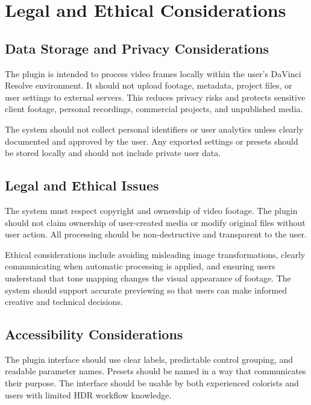 \documentclass[12pt]{article}
\begin{document}

\section{Legal and Ethical Considerations}

\subsection{Data Storage and Privacy Considerations}
The plugin is intended to process video frames locally within the user's DaVinci Resolve environment. It should not upload footage, metadata, project files, or user settings to external servers. This reduces privacy risks and protects sensitive client footage, personal recordings, commercial projects, and unpublished media.

The system should not collect personal identifiers or user analytics unless clearly documented and approved by the user. Any exported settings or presets should be stored locally and should not include private user data.

\subsection{Legal and Ethical Issues}
The system must respect copyright and ownership of video footage. The plugin should not claim ownership of user-created media or modify original files without user action. All processing should be non-destructive and transparent to the user.

Ethical considerations include avoiding misleading image transformations, clearly communicating when automatic processing is applied, and ensuring users understand that tone mapping changes the visual appearance of footage. The system should support accurate previewing so that users can make informed creative and technical decisions.

\subsection{Accessibility Considerations}
The plugin interface should use clear labels, predictable control grouping, and readable parameter names. Presets should be named in a way that communicates their purpose. The interface should be usable by both experienced colorists and users with limited HDR workflow knowledge.

\end{document}
